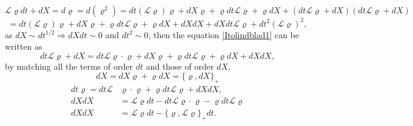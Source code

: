 \[\mathcal{L}\varrho dt+dX=d\varrho=d(\varrho^2)=dt(\mathcal{L}\varrho)\varrho+dX\varrho+\varrho dt\mathcal{L}\varrho+\varrho dX+(dt\mathcal{L}\varrho+dX)(dt\mathcal{L}\varrho+dX)\]
\begin{equation}
=dt(\mathcal{L}\varrho)\varrho+dX\varrho+\varrho dt \mathcal{L}\varrho+\varrho dX+dXdX+dX dt\mathcal{L}\varrho+dt^2(\mathcal{L}\varrho)^2,
\label{Itolindblad1}
\end{equation}
as $dX\sim dt^{1/2}\Rightarrow dXdt\sim 0$ and $dt^2\sim 0$, then the equation \eqref{Itolindblad1} can be written as
\[dt\mathcal{L}\varrho+dX=dt\mathcal{L}\varrho \cdot\varrho+dX\varrho+\varrho dt \mathcal{L}\varrho+\varrho dX+dXdX,\]
by matching all the terms of order $dt$ and those of order $dX$,
\begin{equation}
dX=dX\varrho+\varrho dX=\{\varrho,dX\}_{+}
\label{Itolindblad2}
\end{equation}
\begin{align}
dt\mathcal{\varrho}=dt\mathcal{L}&\varrho \cdot\varrho+\varrho dt\mathcal{L}\varrho + dX dX,\nonumber\\
dXdX&=\mathcal{L}\varrho dt - dt\mathcal{L}\varrho\cdot \varrho - \varrho dt\mathcal{L}\varrho\nonumber\\
dXdX&=\mathcal{L}\varrho dt-\{\varrho,\mathcal{L}\varrho\}_{+}dt.\label{Itolindblad3}
\end{align}

